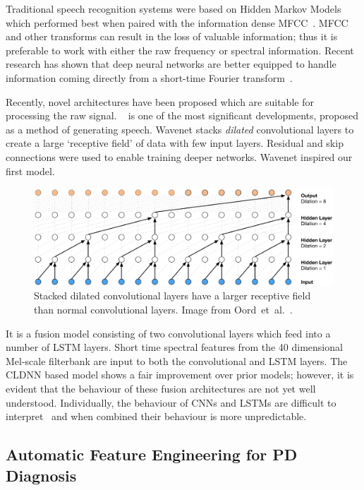 \documentclass[12pt, twoside]{book}
\renewcommand\emph[1]{\textit{\color{USred}{#1}}}
\begin{document}
Traditional speech recognition systems were based on Hidden Markov Models which performed best when paired with the information dense MFCC~\cite{hinton2012speech}. MFCC and other transforms can result in the loss of valuable information; thus it is preferable to work with either the raw frequency or spectral information. Recent research has shown that deep neural networks are better equipped to handle information coming directly from a short-time Fourier transform~\cite{microsoftspeech}. 

Recently, novel architectures have been proposed which are suitable for processing the raw signal. \emph{Wavenet}~\cite{wavenet} is one of the most significant developments, proposed as a method of generating speech. Wavenet stacks \textit{dilated} convolutional layers to create a large `receptive field' of data with few input layers. Residual and skip connections were used to enable training deeper networks. Wavenet inspired our first model.


\begin{figure}[!htb]
	\centering\centerline{\includegraphics[width=1\linewidth]{wavenet.png}}
	\caption{Stacked dilated convolutional layers have a larger receptive field than normal convolutional layers. Image from Oord~et~al.~\cite{wavenet}.}
	\label{wavenet}
	\vspace{-0.5em}
\end{figure}

It is a fusion model consisting of two convolutional layers which feed into a number of LSTM layers. Short time spectral features from the 40 dimensional Mel-scale filterbank are input to both the convolutional and LSTM layers. The CLDNN based model shows a fair improvement over prior models; however, it is evident that the behaviour of these fusion architectures are not yet well understood. Individually, the behaviour of CNNs and LSTMs are difficult to interpret~\cite{cnnvis, visualisernn} and when combined their behaviour is more unpredictable.


\subsection{Automatic Feature Engineering for PD Diagnosis}
\end{document}
